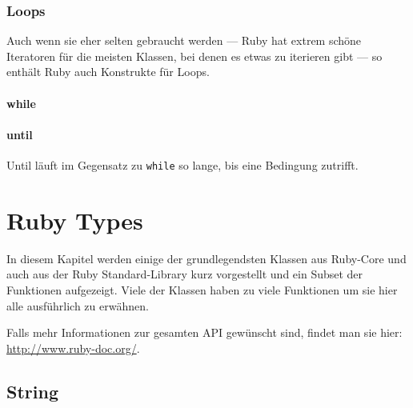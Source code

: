 \documentclass[a4book,11pt,twoside]{scrbook}
\begin{document}




\subsection*{Loops} %
\label{sub:loops}
Auch wenn sie eher selten gebraucht werden — Ruby hat extrem schöne Iteratoren für die meisten Klassen, bei denen es etwas zu iterieren gibt — so enthält Ruby auch Konstrukte für Loops.

\subsubsection*{while} %
\label{ssub:while}


\subsubsection{until} %
\label{ssub:until}
Until läuft im Gegensatz zu \texttt{while} so lange, bis eine Bedingung zutrifft.









\chapter{Ruby Types} %
\label{cha:ruby_types}
In diesem Kapitel werden einige der grundlegendsten Klassen aus Ruby-Core und auch aus der Ruby Standard-Library kurz vorgestellt und ein Subset der Funktionen aufgezeigt. Viele der Klassen haben zu viele Funktionen um sie hier alle ausführlich zu erwähnen.

Falls mehr Informationen zur gesamten API gewünscht sind, findet man sie hier: \url{http://www.ruby-doc.org/}.

\section{String} %
\label{sec:string}





\end{document}

